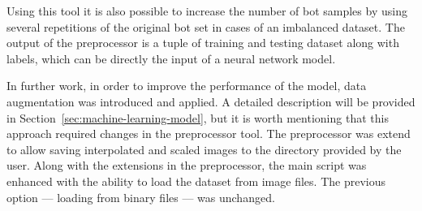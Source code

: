 Using this tool it is also possible to increase the number of bot samples by using several repetitions of the original bot set in cases of an imbalanced dataset.
The output of the preprocessor is a tuple of training and testing dataset along with labels, which can be directly the input of a neural network model.

In further work, in order to improve the performance of the model, data augmentation was introduced and applied.
A detailed description will be provided in Section~\ref{sec:machine-learning-model}, but it is worth mentioning that this approach required changes in the preprocessor tool.
The preprocessor was extend to allow saving interpolated and scaled images to the directory provided by the user.
Along with the extensions in the preprocessor, the main script was enhanced with the ability to load the dataset from image files.
The previous option --- loading from binary files --- was unchanged.